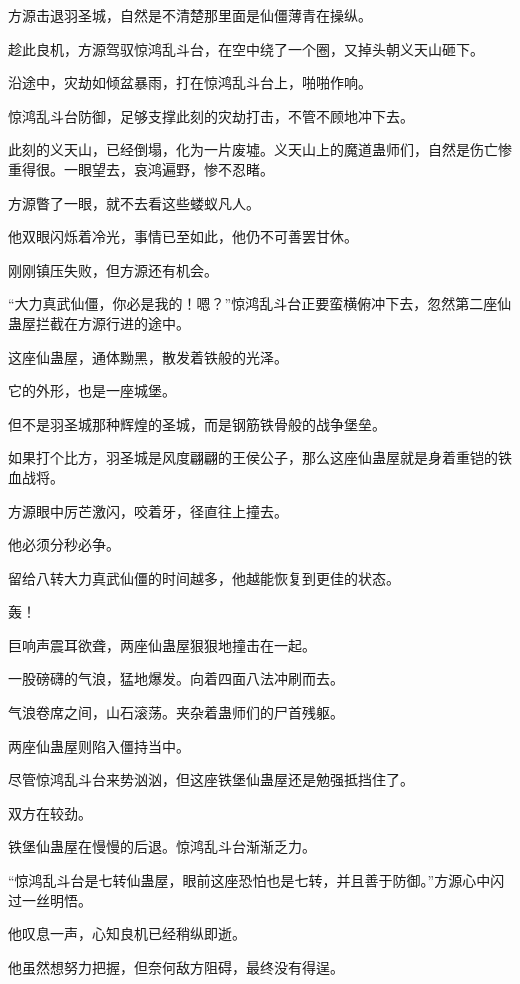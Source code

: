 
\begin{this_body}

方源击退羽圣城，自然是不清楚那里面是仙僵薄青在操纵。

趁此良机，方源驾驭惊鸿乱斗台，在空中绕了一个圈，又掉头朝义天山砸下。

沿途中，灾劫如倾盆暴雨，打在惊鸿乱斗台上，啪啪作响。

惊鸿乱斗台防御，足够支撑此刻的灾劫打击，不管不顾地冲下去。

此刻的义天山，已经倒塌，化为一片废墟。义天山上的魔道蛊师们，自然是伤亡惨重得很。一眼望去，哀鸿遍野，惨不忍睹。

方源瞥了一眼，就不去看这些蝼蚁凡人。

他双眼闪烁着冷光，事情已至如此，他仍不可善罢甘休。

刚刚镇压失败，但方源还有机会。

“大力真武仙僵，你必是我的！嗯？”惊鸿乱斗台正要蛮横俯冲下去，忽然第二座仙蛊屋拦截在方源行进的途中。

这座仙蛊屋，通体黝黑，散发着铁般的光泽。

它的外形，也是一座城堡。

但不是羽圣城那种辉煌的圣城，而是钢筋铁骨般的战争堡垒。

如果打个比方，羽圣城是风度翩翩的王侯公子，那么这座仙蛊屋就是身着重铠的铁血战将。

方源眼中厉芒激闪，咬着牙，径直往上撞去。

他必须分秒必争。

留给八转大力真武仙僵的时间越多，他越能恢复到更佳的状态。

轰！

巨响声震耳欲聋，两座仙蛊屋狠狠地撞击在一起。

一股磅礴的气浪，猛地爆发。向着四面八法冲刷而去。

气浪卷席之间，山石滚荡。夹杂着蛊师们的尸首残躯。

两座仙蛊屋则陷入僵持当中。

尽管惊鸿乱斗台来势汹汹，但这座铁堡仙蛊屋还是勉强抵挡住了。

双方在较劲。

铁堡仙蛊屋在慢慢的后退。惊鸿乱斗台渐渐乏力。

“惊鸿乱斗台是七转仙蛊屋，眼前这座恐怕也是七转，并且善于防御。”方源心中闪过一丝明悟。

他叹息一声，心知良机已经稍纵即逝。

他虽然想努力把握，但奈何敌方阻碍，最终没有得逞。


\end{this_body}
